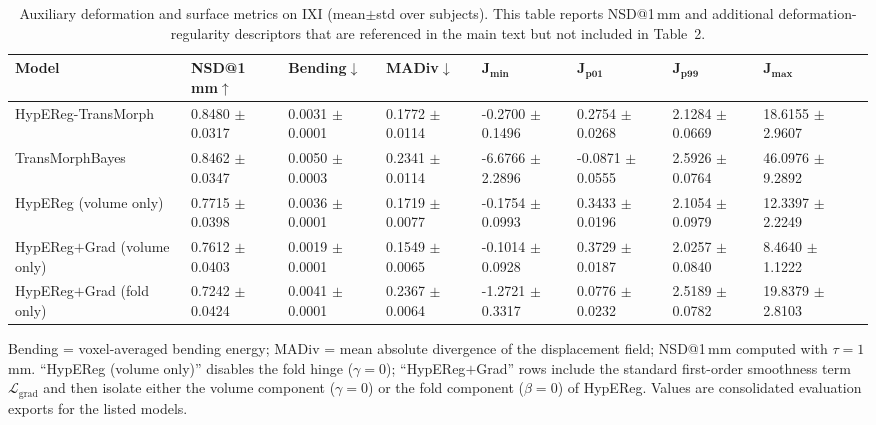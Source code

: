 \documentclass[11pt,a4paper]{article}
\begin{document}
\begin{table}[H]
\caption{Auxiliary deformation and surface metrics on IXI (mean\(\pm\)std over subjects). This table reports NSD@1\,mm and additional deformation-regularity descriptors that are referenced in the main text but not included in Table~2.\label{tab:s0_aux_metrics}}
\scriptsize
\setlength{\tabcolsep}{3pt}
\renewcommand{\arraystretch}{1.1}
\begin{tabularx}{\textwidth}{lXXXXXXXX}
\toprule
\textbf{Model} & \textbf{NSD@1\,mm\(\uparrow\)} & \textbf{Bending\(\downarrow\)} & \textbf{MADiv\(\downarrow\)} & \(\boldsymbol{J_{\min}}\) & \(\boldsymbol{J_{p01}}\) & \(\boldsymbol{J_{p99}}\) & \(\boldsymbol{J_{\max}}\)\\
\midrule
HypEReg-TransMorph & 0.8480 \(\pm\) 0.0317 & 0.0031 \(\pm\) 0.0001 & 0.1772 \(\pm\) 0.0114 & -0.2700 \(\pm\) 0.1496 & 0.2754 \(\pm\) 0.0268 & 2.1284 \(\pm\) 0.0669 & 18.6155 \(\pm\) 2.9607\\
TransMorphBayes & 0.8462 \(\pm\) 0.0347 & 0.0050 \(\pm\) 0.0003 & 0.2341 \(\pm\) 0.0114 & -6.6766 \(\pm\) 2.2896 & -0.0871 \(\pm\) 0.0555 & 2.5926 \(\pm\) 0.0764 & 46.0976 \(\pm\) 9.2892\\
HypEReg (volume only) & 0.7715 \(\pm\) 0.0398 & 0.0036 \(\pm\) 0.0001 & 0.1719 \(\pm\) 0.0077 & -0.1754 \(\pm\) 0.0993 & 0.3433 \(\pm\) 0.0196 & 2.1054 \(\pm\) 0.0979 & 12.3397 \(\pm\) 2.2249\\
HypEReg\(+\)Grad (volume only) & 0.7612 \(\pm\) 0.0403 & 0.0019 \(\pm\) 0.0001 & 0.1549 \(\pm\) 0.0065 & -0.1014 \(\pm\) 0.0928 & 0.3729 \(\pm\) 0.0187 & 2.0257 \(\pm\) 0.0840 & 8.4640 \(\pm\) 1.1222\\
HypEReg\(+\)Grad (fold only) & 0.7242 \(\pm\) 0.0424 & 0.0041 \(\pm\) 0.0001 & 0.2367 \(\pm\) 0.0064 & -1.2721 \(\pm\) 0.3317 & 0.0776 \(\pm\) 0.0232 & 2.5189 \(\pm\) 0.0782 & 19.8379 \(\pm\) 2.8103\\
\bottomrule
\end{tabularx}
\parbox{\textwidth}{\footnotesize Bending = voxel-averaged bending energy; MADiv = mean absolute divergence of the displacement field; NSD@1\,mm computed with \(\tau=1\) mm. ``HypEReg (volume only)'' disables the fold hinge (\(\gamma=0\)); ``HypEReg\(+\)Grad'' rows include the standard first-order smoothness term \(\mathcal{L}_{\mathrm{grad}}\) and then isolate either the volume component (\(\gamma=0\)) or the fold component (\(\beta=0\)) of HypEReg. Values are consolidated evaluation exports for the listed models.}
\end{table}
\end{document}
